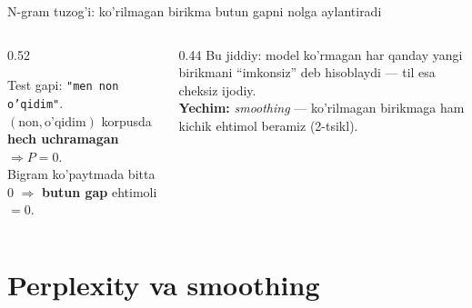 \documentclass[aspectratio=169,11pt]{beamer}
\begin{document}
\begin{frame}{N-gram tuzog'i: ko'rilmagan birikma butun gapni nolga aylantiradi}
  \begin{columns}[T]
    \begin{column}{0.52\textwidth}
      \begin{tcolorbox}[warnbox,title=Nol muammosi (zero problem)]
        \small
        Test gapi: \texttt{"men non o'qidim"}.\\[3pt]
        $(\text{non},\text{o'qidim})$ korpusda \textbf{hech uchramagan}
        $\Rightarrow P=0$.\\[3pt]
        Bigram ko'paytmada bitta $0$ $\Rightarrow$ \textbf{butun gap} ehtimoli
        $= 0$.
      \end{tcolorbox}
    \end{column}
    \begin{column}{0.44\textwidth}
      \footnotesize
      Bu jiddiy: model ko'rmagan har qanday yangi birikmani ``imkonsiz'' deb
      hisoblaydi --- til esa cheksiz ijodiy.\\[4pt]
      \textbf{Yechim:} \textit{smoothing} --- ko'rilmagan birikmaga ham kichik
      ehtimol beramiz (2-tsikl).
    \end{column}
  \end{columns}
\end{frame}

\section[Perplexity]{Perplexity va smoothing}
\end{document}
